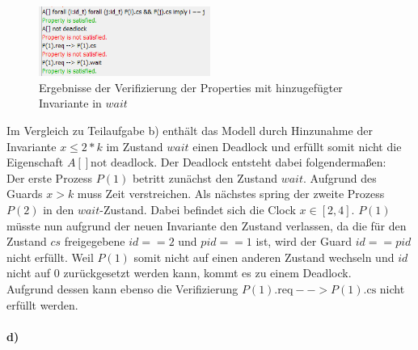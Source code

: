 \begin{figure}[H] 
	\centering 
	\includegraphics[width=0.5\textwidth]{./UPAAAL_Screens/Aufgabe1c_Testlaeufe}
	\caption[Aufgabe 1c)]{Ergebnisse der Verifizierung der Properties mit hinzugefügter Invariante in $wait$}    
\end{figure}

Im Vergleich zu Teilaufgabe b) enthält das Modell durch Hinzunahme der Invariante $x\leq2*k$ im Zustand $wait$ einen Deadlock und erfüllt somit nicht die Eigenschaft $A[] \text{not deadlock}$. Der Deadlock entsteht dabei folgendermaßen: \\

Der erste Prozess $P(1)$ betritt zunächst den Zustand $wait$. Aufgrund des Guards $x>k$ muss Zeit verstreichen. Als nächstes spring der zweite Prozess $P(2)$ in den $wait$-Zustand. Dabei befindet sich die Clock $x \in \left[2,4\right]$. $P(1)$ müsste nun aufgrund der neuen Invariante den Zustand verlassen, da die für den Zustand $cs$ freigegebene $id == 2$ und $pid ==1$ ist,  wird der Guard $id == pid$ nicht erfüllt. Weil $P(1)$ somit nicht auf einen anderen Zustand wechseln und $id$ nicht auf 0 zurückgesetzt werden kann, kommt es zu einem Deadlock. \\

Aufgrund dessen kann ebenso die Verifizierung $P(1).\text{req} --> P(1).\text{cs}$ nicht erfüllt werden.  

\paragraph{d)}\mbox{} \\


